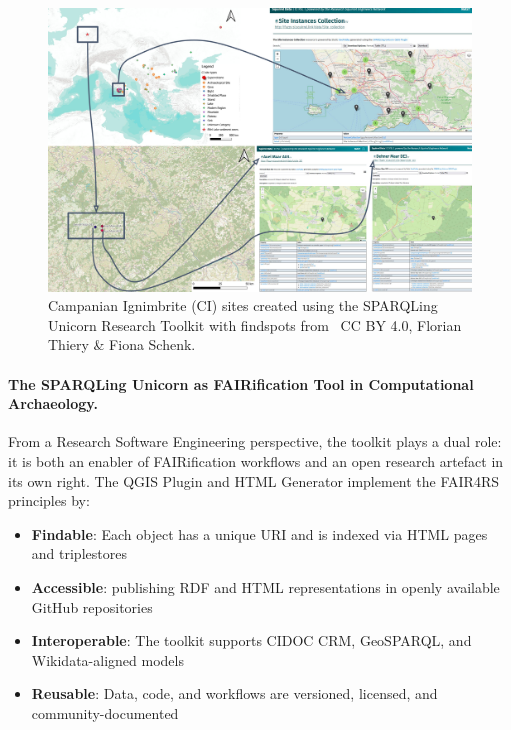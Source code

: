 \documentclass{eceasst}
\begin{document}
\begin{figure}[h!]
    \centering
    \includegraphics[width=0.95\linewidth]{ECEASST-LaTeX-Templates/img/Campanian Ignimbrite LOD Eifel.png}
    \caption{Campanian Ignimbrite (CI) sites created using the SPARQLing Unicorn Research Toolkit with findspots from~\cite{schenk_cryptotephra_2024,thiery_modelling_2023} CC BY 4.0, Florian Thiery \& Fiona Schenk.}
    \label{fig:unicorn_ci}
\end{figure}

\paragraph{The SPARQLing Unicorn as FAIRification Tool in Computational Archaeology.} From a Research Software Engineering perspective, the toolkit plays a dual role: it is both an enabler of FAIRification workflows and an open research artefact in its own right. The QGIS Plugin and HTML Generator implement the FAIR4RS principles by:

\begin{itemize}
    \item \textbf{Findable}: Each object has a unique URI and is indexed via HTML pages and triplestores
    \item \textbf{Accessible}: publishing RDF and HTML representations in openly available GitHub repositories
    \item \textbf{Interoperable}: The toolkit supports CIDOC CRM, GeoSPARQL, and Wikidata-aligned models
    \item \textbf{Reusable}: Data, code, and workflows are versioned, licensed, and community-documented
\end{itemize}
\end{document}
